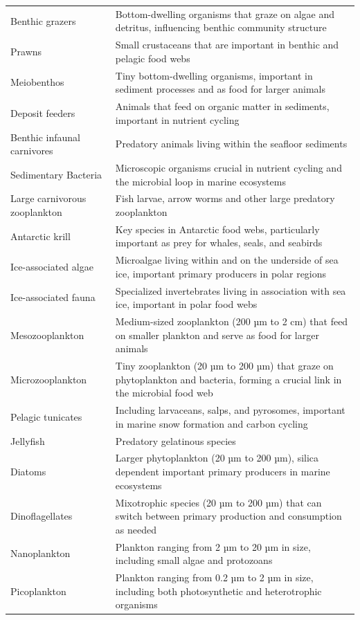 \begin{longtable}{p{}p{}}
  Benthic grazers & Bottom-dwelling organisms that graze on algae and detritus, influencing benthic community structure \\
  Prawns & Small crustaceans that are important in benthic and pelagic food webs \\
  Meiobenthos & Tiny bottom-dwelling organisms, important in sediment processes and as food for larger animals \\
  Deposit feeders & Animals that feed on organic matter in sediments, important in nutrient cycling \\
  Benthic infaunal carnivores & Predatory animals living within the seafloor sediments \\
  Sedimentary Bacteria & Microscopic organisms crucial in nutrient cycling and the microbial loop in marine ecosystems \\
  Large carnivorous zooplankton & Fish larvae, arrow worms and other large predatory zooplankton \\
  Antarctic krill & Key species in Antarctic food webs, particularly important as prey for whales, seals, and seabirds \\
  Ice-associated algae & Microalgae living within and on the underside of sea ice, important primary producers in polar regions \\
  Ice-associated fauna & Specialized invertebrates living in association with sea ice, important in polar food webs \\
  Mesozooplankton & Medium-sized zooplankton (200 µm to 2 cm) that feed on smaller plankton and serve as food for larger animals \\
  Microzooplankton & Tiny zooplankton (20 µm to 200 µm) that graze on phytoplankton and bacteria, forming a crucial link in the microbial food web \\
  Pelagic tunicates & Including larvaceans, salps, and pyrosomes, important in marine snow formation and carbon cycling \\
  Jellyfish & Predatory gelatinous species \\
  Diatoms & Larger phytoplankton (20 µm to 200 µm), silica dependent important primary producers in marine ecosystems \\
  Dinoflagellates & Mixotrophic species (20 µm to 200 µm) that can switch between primary production and consumption as needed \\
  Nanoplankton & Plankton ranging from 2 µm to 20 µm in size, including small algae and protozoans \\
  Picoplankton & Plankton ranging from 0.2 µm to 2 µm in size, including both photosynthetic and heterotrophic organisms \\

\end{longtable}
